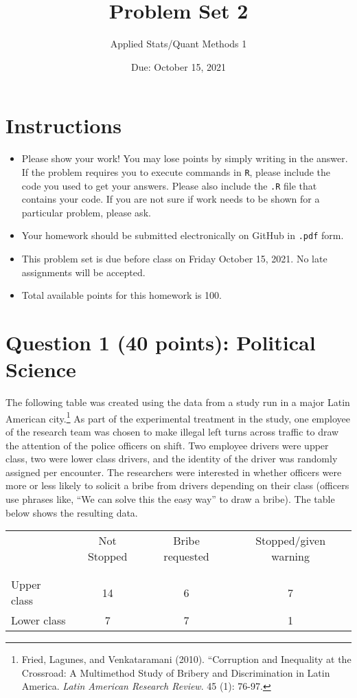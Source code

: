 \documentclass[12pt,letterpaper]{article}
\title{Problem Set 2}
\date{Due: October 15, 2021}
\author{Applied Stats/Quant Methods 1}
\begin{document}
	\maketitle
	\section*{Instructions}
\begin{itemize}
	\item Please show your work! You may lose points by simply writing in the answer. If the problem requires you to execute commands in \texttt{R}, please include the code you used to get your answers. Please also include the \texttt{.R} file that contains your code. If you are not sure if work needs to be shown for a particular problem, please ask.
	\item Your homework should be submitted electronically on GitHub in \texttt{.pdf} form.
	\item This problem set is due before class on Friday October 15, 2021. No late assignments will be accepted.
	\item Total available points for this homework is 100.
\end{itemize}

	
	\vspace{.5cm}
	\section*{Question 1 (40 points): Political Science}
		\vspace{.25cm}
	The following table was created using the data from a study run in a major Latin American city.\footnote{Fried, Lagunes, and Venkataramani (2010). ``Corruption and Inequality at the Crossroad: A Multimethod Study of Bribery and Discrimination in Latin America. \textit{Latin American Research Review}. 45 (1): 76-97.} As part of the experimental treatment in the study, one employee of the research team was chosen to make illegal left turns across traffic to draw the attention of the police officers on shift. Two employee drivers were upper class, two were lower class drivers, and the identity of the driver was randomly assigned per encounter. The researchers were interested in whether officers were more or less likely to solicit a bribe from drivers depending on their class (officers use phrases like, ``We can solve this the easy way'' to draw a bribe). The table below shows the resulting data.

\newpage
\begin{table}[h!]
	\centering
	\begin{tabular}{l | c c c }
		& Not Stopped & Bribe requested & Stopped/given warning \\
		\\[-1.8ex] 
		\hline \\[-1.8ex]
		Upper class & 14 & 6 & 7 \\
		Lower class & 7 & 7 & 1 \\
		\hline
	\end{tabular}
\end{table}
\end{document}
